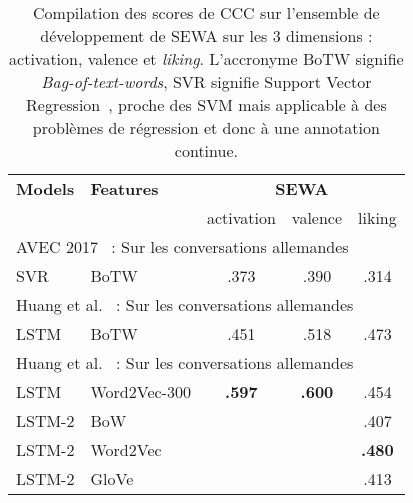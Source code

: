 \begin{table}[]
    \centering
    \begin{tabular}{| l | l | c | c | c |}
        \hline
        \textbf{Models} &\textbf{Features} &\multicolumn{3}{c|}{\textbf{SEWA}} \\ \cline{3-5}
        & &activation &valence &liking \\
        \hline
        \multicolumn{5}{|l|}{AVEC 2017~\cite{AVEC2017} : Sur les conversations allemandes} \\
        \hline
        SVR      &BoTW       &.373  &.390 &.314 \\
       \hline
       \multicolumn{5}{|l|}{Huang et al.~\cite{Huang2017} : Sur les conversations allemandes} \\
       \hline
       LSTM     &BoTW        &.451  &.518 &.473 \\
        \hline
       \multicolumn{5}{|l|}{Huang et al.~\cite{Huang2018} : Sur les conversations allemandes} \\
       \hline
       LSTM       &Word2Vec-300   &\textbf{.597}  &\textbf{.600} &.454 \\
       LSTM-2     &BoW            &  & &.407 \\
       LSTM-2     &Word2Vec       &  & &\textbf{.480} \\
       LSTM-2     &GloVe          &  & &.413 \\
       \hline
    \end{tabular}
    \caption{Compilation des scores de CCC sur l'ensemble de développement de SEWA sur les 3 dimensions : activation, valence et \textit{liking}. L'accronyme BoTW signifie \textit{Bag-of-text-words}, SVR signifie Support Vector Regression~\cite{Smola2004}, proche des SVM mais applicable à des problèmes de régression et donc à une annotation continue.}
    \label{tab:avectexte}
\end{table}
